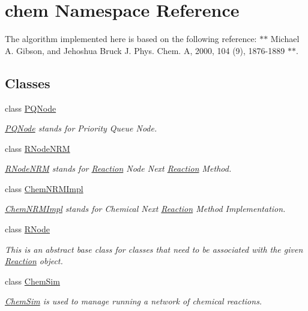 \hypertarget{namespacechem}{\section{chem Namespace Reference}
\label{namespacechem}
}


The algorithm implemented here is based on the following reference\-: $\ast$$\ast$ Michael A. Gibson, and Jehoshua Bruck J. Phys. Chem. A, 2000, 104 (9), 1876-\/1889 $\ast$$\ast$.  


\subsection*{Classes}
\begin{DoxyCompactItemize}
\item 
class \hyperlink{classchem_1_1PQNode}{P\-Q\-Node}
\begin{DoxyCompactList}\small\item\em \hyperlink{classchem_1_1PQNode}{P\-Q\-Node} stands for Priority Queue Node. \end{DoxyCompactList}\item 
class \hyperlink{classchem_1_1RNodeNRM}{R\-Node\-N\-R\-M}
\begin{DoxyCompactList}\small\item\em \hyperlink{classchem_1_1RNodeNRM}{R\-Node\-N\-R\-M} stands for \hyperlink{classchem_1_1Reaction}{Reaction} Node Next \hyperlink{classchem_1_1Reaction}{Reaction} Method. \end{DoxyCompactList}\item 
class \hyperlink{classchem_1_1ChemNRMImpl}{Chem\-N\-R\-M\-Impl}
\begin{DoxyCompactList}\small\item\em \hyperlink{classchem_1_1ChemNRMImpl}{Chem\-N\-R\-M\-Impl} stands for Chemical Next \hyperlink{classchem_1_1Reaction}{Reaction} Method Implementation. \end{DoxyCompactList}\item 
class \hyperlink{classchem_1_1RNode}{R\-Node}
\begin{DoxyCompactList}\small\item\em This is an abstract base class for classes that need to be associated with the given \hyperlink{classchem_1_1Reaction}{Reaction} object. \end{DoxyCompactList}\item 
class \hyperlink{classchem_1_1ChemSim}{Chem\-Sim}
\begin{DoxyCompactList}\small\item\em \hyperlink{classchem_1_1ChemSim}{Chem\-Sim} is used to manage running a network of chemical reactions. \end{DoxyCompactList}\item 

\end{DoxyCompactItemize}
